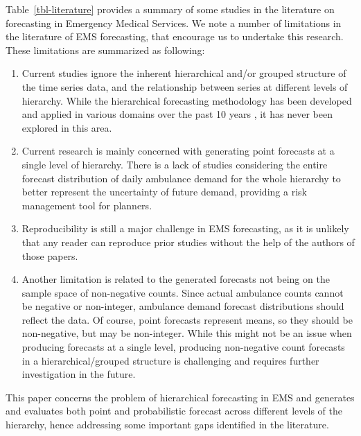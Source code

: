 \documentclass[
  authoryear,
  preprint,
  3p]{elsarticle}
\begin{document}
Table~\ref{tbl-literature} provides a summary of some studies in the
literature on forecasting in Emergency Medical Services. We note a
number of limitations in the literature of EMS forecasting, that
encourage us to undertake this research. These limitations are
summarized as following:

\begin{enumerate}
\def\labelenumi{\arabic{enumi}.}
\item
  Current studies ignore the inherent hierarchical and/or grouped
  structure of the time series data, and the relationship between series
  at different levels of hierarchy. While the hierarchical forecasting
  methodology has been developed and applied in various domains over the
  past 10 years \citep{panagiotelis2023probabilistic}, it has never been
  explored in this area.
\item
  Current research is mainly concerned with generating point forecasts
  at a single level of hierarchy. There is a lack of studies considering
  the entire forecast distribution of daily ambulance demand for the
  whole hierarchy to better represent the uncertainty of future demand,
  providing a risk management tool for planners.
\item
  Reproducibility is still a major challenge in EMS forecasting, as it
  is unlikely that any reader can reproduce prior studies without the
  help of the authors of those papers.
\item
  Another limitation is related to the generated forecasts not being on
  the sample space of non-negative counts. Since actual ambulance counts
  cannot be negative or non-integer, ambulance demand forecast
  distributions should reflect the data. Of course, point forecasts
  represent means, so they should be non-negative, but may be
  non-integer. While this might not be an issue when producing forecasts
  at a single level, producing non-negative count forecasts in a
  hierarchical/grouped structure is challenging and requires further
  investigation in the future.
\end{enumerate}

This paper concerns the problem of hierarchical forecasting in EMS and
generates and evaluates both point and probabilistic forecast across
different levels of the hierarchy, hence addressing some important gaps
identified in the literature.
\end{document}
